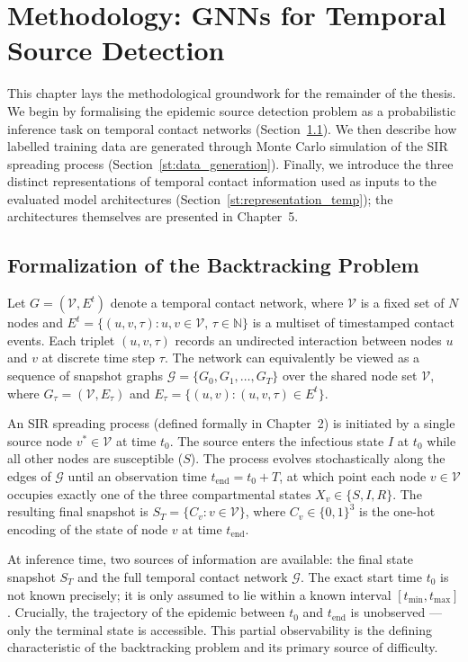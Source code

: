 \chapter{Methodology: GNNs for Temporal Source Detection}
\label{c:chapter2}
This chapter lays the methodological groundwork for the remainder of the thesis. We begin by formalising the epidemic source detection problem as a probabilistic inference task on temporal contact networks (Section~\ref{st:backtracking}). We then describe how labelled training data are generated through Monte Carlo simulation of the SIR spreading process (Section~\ref{st:data_generation}). Finally, we introduce the three distinct representations of temporal contact information used as inputs to the evaluated model architectures (Section~\ref{st:representation_temp}); the architectures themselves are presented in Chapter~5.

\section{Formalization of the Backtracking Problem}
\label{st:backtracking}
Let $G = (\mathcal{V}, E^t)$ denote a temporal contact network, where $\mathcal{V}$ is a fixed set of $N$ nodes and $E^t = \{(u, v, \tau) : u, v \in \mathcal{V},\, \tau \in \mathbb{N}\}$ is a multiset of timestamped contact events. Each triplet $(u, v, \tau)$ records an undirected interaction between nodes $u$ and $v$ at discrete time step $\tau$. The network can equivalently be viewed as a sequence of snapshot graphs $\mathcal{G} = \{G_0, G_1, \ldots, G_T\}$ over the shared node set $\mathcal{V}$, where $G_\tau = (\mathcal{V}, E_\tau)$ and $E_\tau = \{(u,v) : (u,v,\tau) \in E^t\}$.

An SIR spreading process (defined formally in Chapter~2) is initiated by a single source node $v^* \in \mathcal{V}$ at time $t_0$. The source enters the infectious state $I$ at $t_0$ while all other nodes are susceptible ($S$). The process evolves stochastically along the edges of $\mathcal{G}$ until an observation time $t_{\mathrm{end}} = t_0 + T$, at which point each node $v \in \mathcal{V}$ occupies exactly one of the three compartmental states $X_v \in \{S, I, R\}$. The resulting final snapshot is $S_T = \{C_v : v \in \mathcal{V}\}$, where $C_v \in \{0,1\}^3$ is the one-hot encoding of the state of node $v$ at time $t_{\mathrm{end}}$.

At inference time, two sources of information are available: the final state snapshot $S_T$ and the full temporal contact network $\mathcal{G}$. The exact start time $t_0$ is not known precisely; it is only assumed to lie within a known interval $[t_{\min}, t_{\max}]$. Crucially, the trajectory of the epidemic between $t_0$ and $t_{\mathrm{end}}$ is unobserved — only the terminal state is accessible. This partial observability is the defining characteristic of the backtracking problem and its primary source of difficulty.

